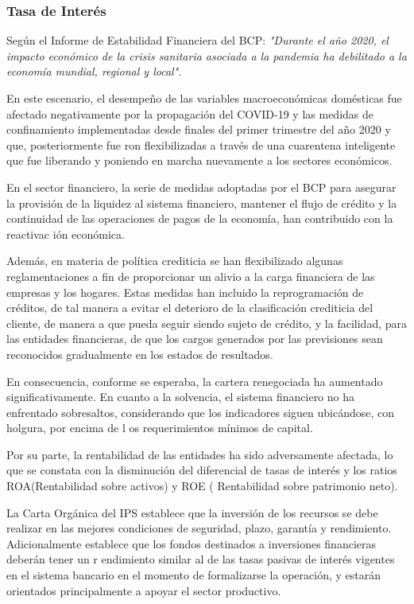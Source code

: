 \subsubsection{Tasa de Interés}

Según el Informe de Estabilidad Financiera del BCP:
\textit{"Durante el año 2020, el impacto económico de la crisis sanitaria asociada a la pandemia ha debilitado a la economía mundial, regional y local".}

En este escenario, el desempeño de las variables macroeconómicas
domésticas fue afectado negativamente por la propagación del COVID-19 y
las medidas de confinamiento implementadas desde finales del primer
trimestre del año 2020 y que, posteriormente fue ron flexibilizadas a
través de una cuarentena inteligente que fue liberando y poniendo en
marcha nuevamente a los sectores económicos.

En el sector financiero, la serie de medidas adoptadas por el BCP para
asegurar la provisión de la liquidez al sistema financiero, mantener el
flujo de crédito y la continuidad de las operaciones de pagos de la
economía, han contribuido con la reactivac ión económica.

Además, en materia de política crediticia se han flexibilizado algunas
reglamentaciones a fin de proporcionar un alivio a la carga financiera
de las empresas y los hogares. Estas medidas han incluido la
reprogramación de créditos, de tal manera a evitar el deterioro de la
clasificación crediticia del cliente, de manera a que pueda seguir
siendo sujeto de crédito, y la facilidad, para las entidades
financieras, de que los cargos generados por las previsiones sean
reconocidos gradualmente en los estados de resultados.

En consecuencia, conforme se esperaba, la cartera renegociada ha
aumentado significativamente. En cuanto a la solvencia, el sistema
financiero no ha enfrentado sobresaltos, considerando que los
indicadores siguen ubicándose, con holgura, por encima de l os
requerimientos mínimos de capital.

Por su parte, la rentabilidad de las entidades ha sido adversamente
afectada, lo que se constata con la disminución del diferencial de tasas
de interés y los ratios ROA(Rentabilidad sobre activos) y ROE (
Rentabilidad sobre patrimonio neto).

La Carta Orgánica del IPS establece que la inversión de los recursos se
debe realizar en las mejores condiciones de seguridad, plazo, garantía y
rendimiento. Adicionalmente establece que los fondos destinados a
inversiones financieras deberán tener un r endimiento similar al de las
tasas pasivas de interés vigentes en el sistema bancario en el momento
de formalizarse la operación, y estarán orientados principalmente a
apoyar el sector productivo.

